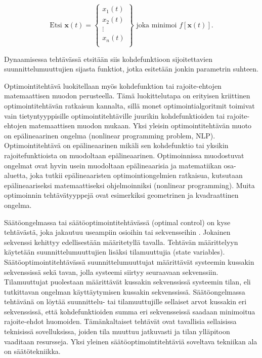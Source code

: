 \documentclass[12pt]{article}
\newenvironment{content}{\pagenumbering{arabic}}{}
\begin{document}
\begin{content}
\begin{equation}
\label{dynaaminen}
\text{Etsi } \textbf{x}(t) = 
\begin{Bmatrix} 
x_1(t) \\ 
x_2(t) \\ 
\vdots \\ 
x_n(t) \\ 
\end{Bmatrix}
\text{    joka minimoi } f[\textbf{x}(t)].
\end{equation}

Dynaamisessa tehtävässä etsitään siis kohdefunktioon sijoitettavien suunnittelumuuttujien sijasta funktiot, jotka esitetään jonkin parametrin suhteen. 

Optimointitehtävä luokitellaan myös kohdefunktion tai rajoite-ehtojen matemaattisen muodon perusteella. Tämä luokittelutapa on erityisen kriittinen optimointitehtävän ratkaisun kannalta, sillä monet optimointialgoritmit toimivat vain tietyntyyppisille optimointitehtäville juurikin kohdefunktioiden tai rajoite-ehtojen matemaattisen muodon mukaan. Yksi yleisin optimointitehtävän muoto on epälineaarinen ongelma (nonlinear programming problem, NLP). Optimointitehtävä on epälineaarinen mikäli sen kohdefunktio tai yksikin rajoitefunktioista on muodoltaan epälineaarinen. Optimoinnissa muodostuvat ongelmat ovat hyvin usein muodoltaan epälineaarisia ja matematiikan osa-aluetta, joka tutkii epälineaaristen optimointiongelmien ratkaisua, kutsutaan epälineaariseksi matemaattiseksi ohjelmoinniksi (nonlinear programming). Muita optimoinnin tehtävätyyppejä ovat esimerkiksi geometrinen ja kvadraattinen ongelma.  

Säätöongelmassa tai säätöoptimointitehtävässä (optimal control) on kyse tehtävästä, joka jakautuu useampiin osioihin tai sekvensseihin . Jokainen sekvenssi kehittyy edellisestään määritetyllä tavalla. Tehtävän määrittelyyn käytetään suunnittelumuuttujien lisäksi tilamuuttujia (state variables). Säätöoptimointitehtävässä suunnittelumuuttujat määrittävät systeemin kussakin sekvenssissä sekä tavan, jolla systeemi siirtyy seuraavaan sekvenssiin. Tilamuuttujat puolestaan määrittävät kussakin sekvenssissä systeemin tilan, eli tutkittavan ongelman käyttäytymisen kussakin sekvenssissä. Säätöongelmassa tehtävänä on löytää suunnittelu- tai tilamuuttujille sellaiset arvot kussakin eri sekvenssissä, että kohdefunktioiden summa eri sekvensseissä saadaan minimoitua rajoite-ehdot huomoiden. Tämänkaltaiset tehtävät ovat tavallisia sellaisissa teknisissä sovelluksissa, joiden tila muuttuu jatkuvasti ja tilan ylläpitoon vaaditaan resursseja. Yksi yleinen säätöoptimointitehtäviä soveltava tekniikan ala on säätötekniikka.




\end{content}
\end{document}
